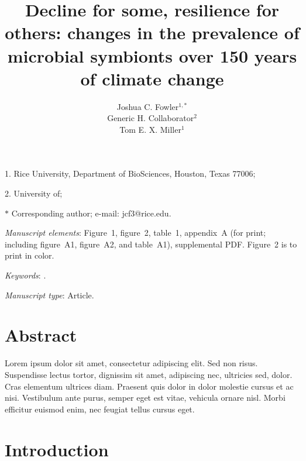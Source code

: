 \documentclass[11pt]{article}
\title{Decline for some, resilience for others: changes in the prevalence of microbial symbionts over 150 years of climate change}
\author{Joshua C. Fowler$^{1,\ast}$ \\
	Generic H. Collaborator$^{2}$ \\
	Tom E. X. Miller$^{1}$}
\date{}
\begin{document}
	
	\maketitle
	
	\noindent{} 1. Rice University, Department of BioSciences, Houston, Texas 77006;

	\noindent{} 2. University of;

	\noindent{} $\ast$ Corresponding author; e-mail: jcf3@rice.edu.
	
	\bigskip
	
	\textit{Manuscript elements}: Figure~1, figure~2, table~1, appendix~A (for print; including figure~A1, figure~A2, and table~A1), supplemental PDF. Figure~2 is to print in color.
	
	\bigskip
	
	\textit{Keywords}: .
	
	\bigskip
	
	\textit{Manuscript type}: Article. %
	
	\bigskip
	
	
	
	\newpage{}
	
	\section*{Abstract}
	
	Lorem ipsum dolor sit amet, consectetur adipiscing elit. Sed non risus. Suspendisse lectus tortor, dignissim sit amet, adipiscing nec, ultricies sed, dolor. Cras elementum ultrices diam. Praesent quis dolor in dolor molestie cursus et ac nisi. Vestibulum ante purus, semper eget est vitae, vehicula ornare nisl. Morbi efficitur euismod enim, nec feugiat tellus cursus eget. 
	
	\newpage{}
	
	\section*{Introduction}
	
\end{document}
